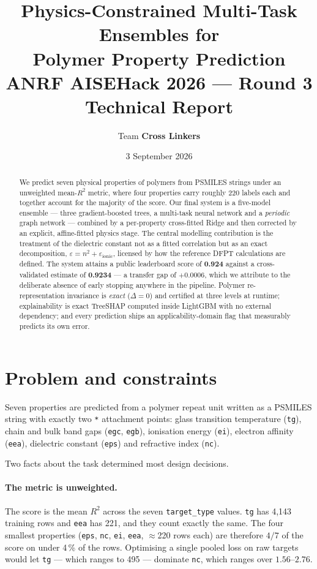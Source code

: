 \documentclass[11pt,a4paper]{article}
\title{\textbf{Physics-Constrained Multi-Task Ensembles for\\ Polymer Property Prediction}\\[0.4em]
\large ANRF AISEHack 2026 --- Round 3 Technical Report}
\author{Team \textbf{Cross Linkers}}
\date{3 September 2026}
\newcommand{\prop}[1]{\texttt{#1}}
\newcommand{\R}{$R^2$}
\begin{document}
\maketitle

\begin{abstract}
\noindent
We predict seven physical properties of polymers from PSMILES strings under an
unweighted mean-\R{} metric, where four properties carry roughly 220 labels each
and together account for the majority of the score. Our final system is a
five-model ensemble --- three gradient-boosted trees, a multi-task neural
network and a \emph{periodic} graph network --- combined by a per-property
cross-fitted Ridge and then corrected by an explicit, affine-fitted physics
stage. The central modelling contribution is the treatment of the dielectric
constant not as a fitted correlation but as an exact decomposition,
$\varepsilon = n^2 + \varepsilon_{\text{ionic}}$, licensed by how the reference
DFPT calculations are defined. The system attains a public leaderboard score of
\textbf{0.924} against a cross-validated estimate of \textbf{0.9234} --- a
transfer gap of $+0.0006$, which we attribute to the deliberate absence of
early stopping anywhere in the pipeline. Polymer re-representation invariance is
\emph{exact} ($\Delta = 0$) and certified at three levels at runtime;
explainability is exact TreeSHAP computed inside LightGBM with no external
dependency; and every prediction ships an applicability-domain flag that
measurably predicts its own error.
\end{abstract}

\section{Problem and constraints}

Seven properties are predicted from a polymer repeat unit written as a PSMILES
string with exactly two \texttt{*} attachment points: glass transition
temperature (\prop{tg}), chain and bulk band gaps (\prop{egc}, \prop{egb}),
ionisation energy (\prop{ei}), electron affinity (\prop{eea}), dielectric
constant (\prop{eps}) and refractive index (\prop{nc}).

Two facts about the task determined most design decisions.

\paragraph{The metric is unweighted.} The score is the mean \R{} across the
seven \texttt{target\_type} values. \prop{tg} has 4{,}143 training rows and
\prop{eea} has 221, and they count exactly the same. The four smallest
properties (\prop{eps}, \prop{nc}, \prop{ei}, \prop{eea}, $\approx$220 rows
each) are therefore $4/7$ of the score on under 4\,\% of the rows. Optimising a
single pooled loss on raw targets would let \prop{tg} --- which ranges to 495 ---
dominate \prop{nc}, which ranges over $1.56$--$2.76$.
\end{document}
